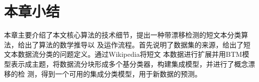   






\section{本章小结}
本章主要介绍了本文核心算法的技术细节，提出一种带漂移检测的短文本分类算法，给出了算法的数学推导以
及运作流程。首先说明了数据集的来源，给出了短文本数据流分类的问题定义。通过Wikipedia将短文
本数据进行扩展并用BTM模型表示成主题，将数据流分块形成多个基分类器，构建集成模型，并进行了概念漂移的检
测，得到一个可用的集成分类模型，用于新数据的预测。

